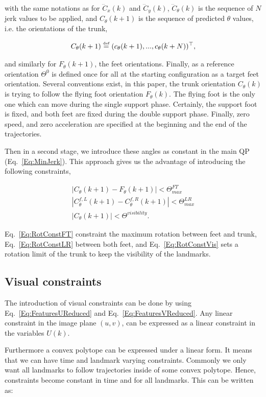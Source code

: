 \noindent with the same notations as for $\dddot{C}_x(k)$ and $\dddot{C}_y(k)$, $\dddot{C}_{\theta}(k)$ is the sequence of $N$ jerk values to be applied, and $C_{\theta}(k+1)$ is the sequence of predicted $\theta$ values, i.e. the orientations of the trunk,  

$$
C_{\theta}(k+1) \stackrel{\mbox{\tiny def}}{=} (c_{\theta}(k+1),...,c_{\theta}(k+N))^{\top},
$$

\noindent and similarly for $F_{\theta}(k+1)$, the feet orientations. Finally, as a reference orientation $\Theta^{0}$ is defined once for all at the starting configuration as a target feet orientation. Several conventions exist, in this paper, the trunk orientation $C_{\theta}(k)$ is trying to follow the flying foot orientation $F_{\theta}(k)$. The flying foot is the only one which can move during the single support phase. Certainly, the support foot is fixed, and both feet are fixed during the double support phase. Finally, zero speed, and zero acceleration are specified at the beginning and the end of the trajectories.

Then in a second stage, we introduce these angles as constant in the main QP (Eq.~\ref{Eq:MinJerk}). This approach gives us the advantage of introducing the following constraints,

\begin{eqnarray}
\label{Eq:RotConstFT}
| C_{\theta}(k+1) - F_{\theta}(k+1)| < \Theta^{FT}_{max} \\
\label{Eq:RotConstLR}
| C_{\theta}^{f,L}(k+1) - C_{\theta}^{f,R}(k+1)| < \Theta^{LR}_{max} \\
\label{Eq:RotConstVis}
| C_{\theta}(k+1)| < \Theta^{visibility}.
\end{eqnarray}

Eq.~\ref{Eq:RotConstFT} constraint the maximum rotation between feet and trunk, Eq.~\ref{Eq:RotConstLR} between both feet, and Eq.~\ref{Eq:RotConstVis} sets a rotation limit of the trunk to keep the visibility of the landmarks.

\subsection{Visual constraints}


The introduction of visual constraints can be done by using Eq.~\ref{Eq:FeaturesUReduced} and Eq.~\ref{Eq:FeaturesVReduced}. Any linear constraint in the image plane $(u,v)$, can be expressed as a linear constraint in the variables $U(k)$.

Furthermore a convex polytope can be expressed under a linear form. It means that we can have time and landmark varying constraints. Commonly we only want all landmarks to follow trajectories inside of some convex polytope. Hence, constraints become constant in time and for all landmarks. This can be written as:

